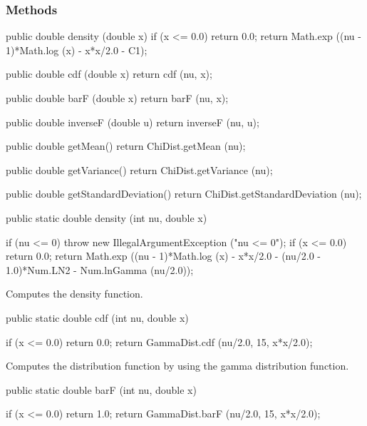\subsubsection* {Methods}

\begin{code}\begin{hide}

   public double density (double x) {
       if (x <= 0.0)
         return 0.0;
      return Math.exp ((nu - 1)*Math.log (x) - x*x/2.0 - C1);
   }

   public double cdf (double x) {
      return cdf (nu, x);
   }

   public double barF (double x) {
      return barF (nu, x);
   }

   public double inverseF (double u) {
      return inverseF (nu, u);
   }

   public double getMean() {
      return ChiDist.getMean (nu);
   }

   public double getVariance() {
      return ChiDist.getVariance (nu);
   }

   public double getStandardDeviation() {
      return ChiDist.getStandardDeviation (nu);
   }\end{hide}

   public static double density (int nu, double x)\begin{hide} {
      if (nu <= 0)
         throw new IllegalArgumentException ("nu <= 0");
      if (x <= 0.0)
         return 0.0;
      return Math.exp ((nu - 1)*Math.log (x) - x*x/2.0
                         - (nu/2.0 - 1.0)*Num.LN2 - Num.lnGamma (nu/2.0));
   }\end{hide}
\end{code}
\begin{tabb} Computes the density function.
\end{tabb}
\begin{code}

   public static double cdf (int nu, double x)\begin{hide} {
      if (x <= 0.0)
         return 0.0;
      return GammaDist.cdf (nu/2.0, 15, x*x/2.0);
   }\end{hide}
\end{code}
 \begin{tabb}
  Computes the  distribution function by using the
  gamma distribution function.
 \end{tabb}
\begin{code}

   public static double barF (int nu, double x)\begin{hide} {
      if (x <= 0.0)
         return 1.0;
      return GammaDist.barF (nu/2.0, 15, x*x/2.0);
   }\end{hide}
\end{code}
